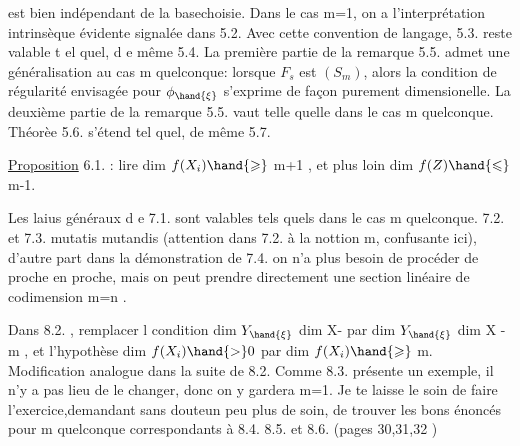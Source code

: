 
est bien indépendant de la base\hand{/}choisie.  Dans le cas  m=1, on a
l'interprétation intrinsèque évidente signalée dans 5.2.  Avec cette
convention de langage, 5.3.  reste valable t el quel, d e même 5.4.
La première partie de la remarque 5.5.   admet une  
généralisation au
 cas m quelconque:  lorsque $F_s$  est  $(S_m)$, alors la condition de
régularité envisagée pour $\phi_{\hand{\xi}}$  s'exprime de façon purement dimensionelle.
La deuxième partie de la remarque 5.5. vaut telle quelle dans le cas
m quelconque.      Théorèe 5.6.  s'étend tel quel,  de même 5.7.

\uline{Proposition} 6.1.  :  lire   dim $f(X_i) \hand{\geqslant}$  m+1 ,  et
plus loin   dim $f(Z) \hand{\leqslant}$ m-1.

Les laius généraux d e 7.1. sont valables tels quels dans le cas
m quelconque.  7.2. et 7.3.  mutatis mutandis (attention dans 7.2.
à la nottion m, confusante ici),  d'autre part dans la démonstration
de 7.4. on n'a plus besoin de procéder de proche en proche, mais on
peut prendre directement une section linéaire  de codimension m=n .

Dans 8.2. , remplacer l condition    dim $Y_{\hand{\xi}}$ \hand{$>$} dim X-
par  dim $Y_{\hand{\xi}}$ \hand{$>$}  dim X  - m , et l'hypothèse  dim $f(X_i) \hand{>} 0$  par
dim $f(X_i) \hand{\geqslant}$ m.   Modification analogue dans la suite de 8.2.  Comme
8.3.  présente un exemple, il n'y a pas lieu de le changer, donc on
y gardera m=1.   Je te laisse le soin de faire l'exercice,demandant
sans doute\hand{/}un peu plus de soin, de trouver  les bons énoncés pour m
quelconque correspondants à  8.4.  8.5.  et 8.6.   (pages 30,31,32 )\hand{;}

